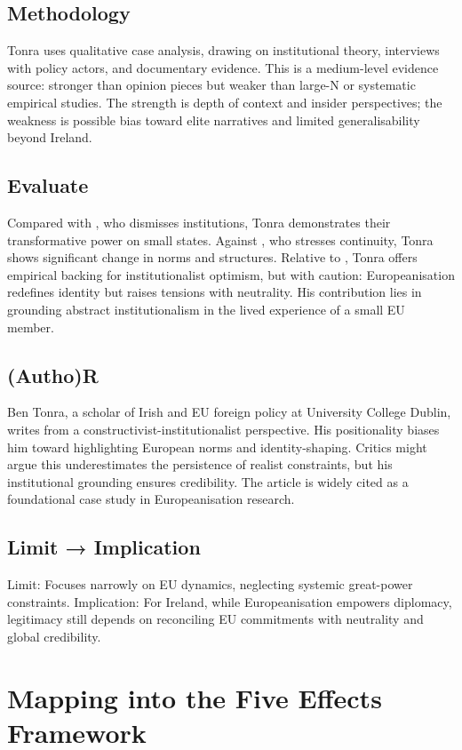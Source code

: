 \subsection*{Methodology}
Tonra uses qualitative case analysis, drawing on institutional theory, interviews with policy actors, and documentary evidence. This is a medium-level evidence source: stronger than opinion pieces but weaker than large-N or systematic empirical studies. The strength is depth of context and insider perspectives; the weakness is possible bias toward elite narratives and limited generalisability beyond Ireland.

\subsection*{Evaluate}
Compared with \textcite{MEARSHEIMER_1994}, who dismisses institutions, Tonra demonstrates their transformative power on small states. Against \textcite{GRAY_2005}, who stresses continuity, Tonra shows significant change in norms and structures. Relative to \textcite{KEOHANE_1988}, Tonra offers empirical backing for institutionalist optimism, but with caution: Europeanisation redefines identity but raises tensions with neutrality. His contribution lies in grounding abstract institutionalism in the lived experience of a small EU member.

\subsection*{(Autho)R}
Ben Tonra, a scholar of Irish and EU foreign policy at University College Dublin, writes from a constructivist-institutionalist perspective. His positionality biases him toward highlighting European norms and identity-shaping. Critics might argue this underestimates the persistence of realist constraints, but his institutional grounding ensures credibility. The article is widely cited as a foundational case study in Europeanisation research.

\subsection*{Limit → Implication}
Limit: Focuses narrowly on EU dynamics, neglecting systemic great-power constraints.  
Implication: For Ireland, while Europeanisation empowers diplomacy, legitimacy still depends on reconciling EU commitments with neutrality and global credibility.

\section*{Mapping into the Five Effects Framework}

